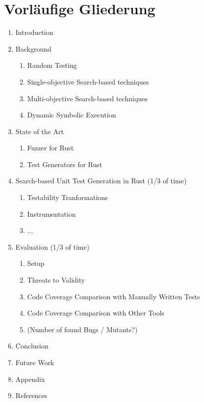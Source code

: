 \documentclass{article}
\begin{document}
\section{Vorläufige Gliederung}
\begin{enumerate}
    \item Introduction
    \item Background \begin{enumerate}
        \item Random Testing
        \item Single-objective Search-based techniques
        \item Multi-objective Search-based techniques
        \item Dynamic Symbolic Execution
    \end{enumerate}
    \item State of the Art \begin{enumerate}
        \item Fuzzer for Rust
        \item Test Generators for Rust
    \end{enumerate}
    \item Search-based Unit Test Generation in Rust (1/3 of time) \begin{enumerate}
        \item Testability Tranformations
        \item Instrumentation
        \item ...
    \end{enumerate}
    \item Evaluation (1/3 of time) \begin{enumerate} 
        \item Setup 
        \item Threats to Validity
        \item Code Coverage Comparison with Manually Written Tests
        \item Code Coverage Comparison with Other Tools
        \item (Number of found Bugs / Mutants?)
    \end{enumerate}
    \item Conclusion
    \item Future Work
    \item Appendix
    \item References
\end{enumerate}

    
\end{document}
